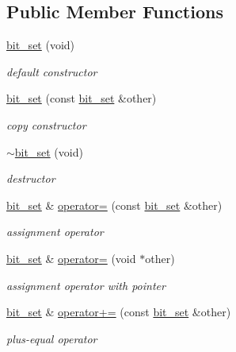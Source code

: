 \subsection*{Public Member Functions}
\begin{DoxyCompactItemize}
\item 
\hyperlink{classcrap_1_1bit__set_a637e5ed9347b437f4931d47ea7197789}{bit\-\_\-set} (void)
\begin{DoxyCompactList}\small\item\em default constructor \end{DoxyCompactList}\item 
\hyperlink{classcrap_1_1bit__set_a08a9c32a0783390cb10095b2eb1637ec}{bit\-\_\-set} (const \hyperlink{classcrap_1_1bit__set}{bit\-\_\-set} \&other)
\begin{DoxyCompactList}\small\item\em copy constructor \end{DoxyCompactList}\item 
\hyperlink{classcrap_1_1bit__set_ac6c26b4d5a554c1ebb55e65d4aa9dc62}{$\sim$bit\-\_\-set} (void)
\begin{DoxyCompactList}\small\item\em destructor \end{DoxyCompactList}\item 
\hyperlink{classcrap_1_1bit__set}{bit\-\_\-set} \& \hyperlink{classcrap_1_1bit__set_a8e17967e278f7dfe9ae336c0efb3d82c}{operator=} (const \hyperlink{classcrap_1_1bit__set}{bit\-\_\-set} \&other)
\begin{DoxyCompactList}\small\item\em assignment operator \end{DoxyCompactList}\item 
\hyperlink{classcrap_1_1bit__set}{bit\-\_\-set} \& \hyperlink{classcrap_1_1bit__set_a2ae2bd31cb1c618a657ab2fb266633c0}{operator=} (void $\ast$other)
\begin{DoxyCompactList}\small\item\em assignment operator with pointer \end{DoxyCompactList}\item 
\hyperlink{classcrap_1_1bit__set}{bit\-\_\-set} \& \hyperlink{classcrap_1_1bit__set_ad15d347927bf719d2ede49730ecdc941}{operator+=} (const \hyperlink{classcrap_1_1bit__set}{bit\-\_\-set} \&other)
\begin{DoxyCompactList}\small\item\em plus-\/equal operator \end{DoxyCompactList}\item 

\end{DoxyCompactItemize}
